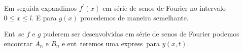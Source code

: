 Em seguida expandimos $f^{'}(x)$ em s\'erie de senos de Fourier no
intervalo $0 \leq x \leq l$. E para $g(x)$ procedemos
de maneira semelhante.

Ent\ao\, se $f$ e $g$ puderem ser desenvolvidas em s\'erie de senos de
Fourier podemos encontrar $A_{n}$ e $B_{n}$ e ent\ao\ teremos uma
express\ao\ para $y(x,t)$.


